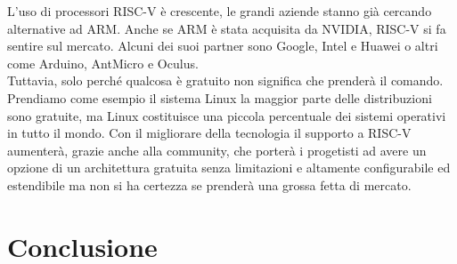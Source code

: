 \documentclass[12pt,a4paper]{report}
\begin{document}
L’uso di processori RISC-V è crescente,  le grandi aziende stanno già cercando alternative ad ARM. Anche se ARM è stata acquisita da  NVIDIA,  RISC-V si fa sentire sul mercato. Alcuni dei suoi partner sono Google, Intel e Huawei o altri come Arduino, AntMicro e Oculus.  \\

Tuttavia, solo perché qualcosa è gratuito non significa che prenderà il comando. Prendiamo come esempio il sistema Linux la maggior parte delle distribuzioni sono gratuite, ma Linux costituisce una piccola percentuale dei sistemi operativi in tutto il mondo.   Con il migliorare della tecnologia il supporto a RISC-V aumenterà, grazie anche alla community, che porterà i progetisti ad avere un opzione di un architettura gratuita senza limitazioni e altamente configurabile ed estendibile ma non si ha certezza se prenderà una grossa fetta di mercato.

\chapter{Conclusione}

\printbibliography
\end{document}
